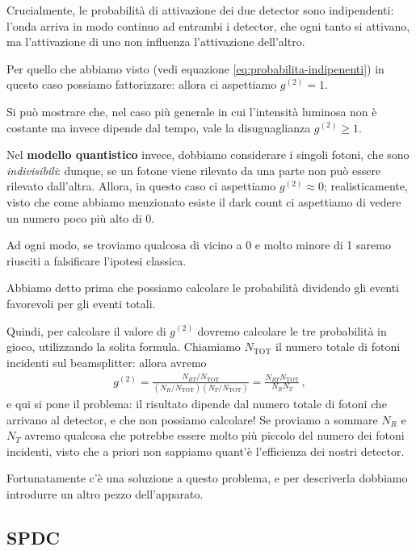 \documentclass{article}
\begin{document}
Crucialmente, le probabilità di attivazione dei due detector sono indipendenti: l'onda arriva in modo continuo ad entrambi i detector, che ogni tanto si attivano, ma l'attivazione di uno non influenza l'attivazione dell'altro. 

Per quello che abbiamo visto (vedi equazione \eqref{eq:probabilita-indipenenti}) in questo caso possiamo fattorizzare: allora ci aspettiamo \(g^{(2)} = 1\). 

Si può mostrare che, nel caso più generale in cui l'intensità luminosa non è costante ma invece dipende dal tempo, vale la disuguaglianza \(g^{(2)} \geq 1\).

Nel \textbf{modello quantistico} invece, dobbiamo considerare i singoli fotoni, che sono \emph{indivisibili}: dunque, se un fotone viene rilevato da una parte non può essere rilevato dall'altra. Allora, in questo caso ci aspettiamo \(g^{(2)} \approx 0\); realisticamente, visto che come abbiamo menzionato esiste il dark count ci aspettiamo di vedere un numero poco più alto di 0.

Ad ogni modo, se troviamo qualcosa di vicino a 0 e molto minore di 1 saremo riusciti a falsificare l'ipotesi classica.

Abbiamo detto prima che possiamo calcolare le probabilità dividendo gli eventi favorevoli per gli eventi totali.

Quindi, per calcolare il valore di \(g^{(2)}\) dovremo calcolare le tre probabilità in gioco, utilizzando la solita formula. Chiamiamo \(N _{\text{TOT}}\) il numero totale di fotoni incidenti sul beamsplitter: allora avremo 
%
\begin{align}
g^{(2)} = \frac{N_{RT} / N _{\text{TOT}}}{(N_R / N _{\text{TOT}}) (N_T / N _{\text{TOT}})} = \frac{N_{RT} N _{\text{TOT}}}{N_R N_T}
\,,
\end{align}
%
e qui si pone il problema: il risultato dipende dal numero totale di fotoni che arrivano al detector, e che non possiamo calcolare! Se proviamo a sommare \(N_R\) e \(N_T\) avremo qualcosa che potrebbe essere molto più piccolo del numero dei fotoni incidenti, visto che a priori non sappiamo quant'è l'efficienza dei nostri detector.

Fortunatamente c'è una soluzione a questo problema, e per descriverla dobbiamo introdurre un altro pezzo dell'apparato.

\subsection{SPDC}
\end{document}
